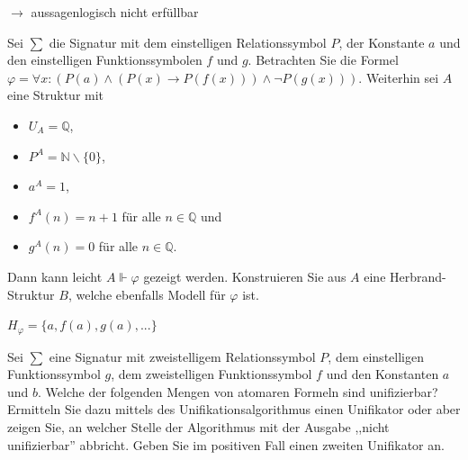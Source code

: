 \documentclass[10pt, a4paper]{exam}
\begin{document}
\begin{questions}
\begin{parts}
\begin{solution}
            $\rightarrow$ aussagenlogisch nicht erfüllbar
        \end{solution}
    \end{parts}

    \question Sei $\sum$ die Signatur mit dem einstelligen Relationssymbol $P$, der Konstante $a$ und den einstelligen Funktionssymbolen $f$ und $g$. Betrachten Sie die Formel $\varphi=\forall x:(P(a)\wedge(P(x)\rightarrow P(f(x)))\wedge\lnot P(g(x)))$. Weiterhin sei $A$ eine Struktur mit
    \begin{itemize}
        \item $U_A=\mathbb{Q}$,
        \item $P^A=\mathbb{N}\backslash\{0\}$,
        \item $a^A=1$,
        \item $f^A(n)=n+1$ für alle $n\in\mathbb{Q}$ und
        \item $g^A(n)=0$ für alle $n\in\mathbb{Q}$.
    \end{itemize}
    Dann kann leicht $A\Vdash\varphi$ gezeigt werden. Konstruieren Sie aus $A$ eine Herbrand-Struktur $B$, welche ebenfalls Modell für $\varphi$ ist.
    \begin{solution}

        $H_{\varphi} = \{a, f(a), g(a), ... \}$

    \end{solution}

    \question Sei $\sum$ eine Signatur mit zweistelligem Relationssymbol $P$, dem einstelligen Funktionssymbol $g$, dem zweistelligen Funktionssymbol $f$ und den Konstanten $a$ und $b$. Welche der folgenden Mengen von atomaren Formeln sind unifizierbar? Ermitteln Sie dazu mittels des Unifikationsalgorithmus einen Unifikator oder aber zeigen Sie, an welcher Stelle der Algorithmus mit der Ausgabe ,,nicht unifizierbar'' abbricht. Geben Sie im positiven Fall einen zweiten Unifikator an.
\end{questions}
\end{document}
